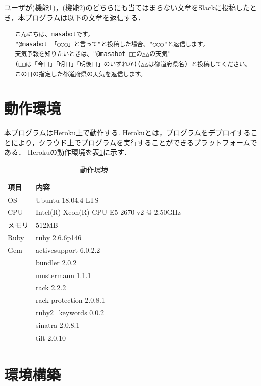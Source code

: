 \documentclass[12pt]{jsarticle}
\begin{document}
ユーザが(機能1)，(機能2)のどちらにも当てはまらない文章をSlackに投稿したとき，本プログラムは以下の文章を返信する．
\begin{verbatim}
   こんにちは、masabotです。        
   "@masabot 「○○○」と言って"と投稿した場合、"○○○"と返信します。
   天気予報を知りたいときは、"@masabot □□の△△の天気" 
   (□□は「今日」「明日」「明後日」のいずれか)(△△は都道府県名) と投稿してください。
   この日の指定した都道府県の天気を返信します。
\end{verbatim}

\section{動作環境}\label{sec:environment}
本プログラムはHeroku上で動作する.
Herokuとは，プログラムをデプロイすることにより，クラウド上でプログラムを実行することができるプラットフォームである．
Herokuの動作環境を表\ref{tab:2}に示す．
\begin{table}[t]
  \begin{center}
    \caption{動作環境}\label{tab:2}
    \begin{tabular}{l|l}
      \hline\hline
      \multicolumn{1}{l|}{項目} & \multicolumn{1}{l}{内容}\\
      \hline
      OS & Ubuntu 18.04.4 LTS\\
      CPU & Intel(R) Xeon(R) CPU E5-2670 v2 @ 2.50GHz\\
      メモリ & 512MB\\
      Ruby & ruby 2.6.6p146\\
      Gem & activesupport 6.0.2.2\\
     & bundler 2.0.2\\
     & mustermann 1.1.1\\
     & rack 2.2.2\\
     & rack-protection 2.0.8.1\\
     & ruby2\_keywords 0.0.2\\ 
     & sinatra 2.0.8.1\\
     & tilt 2.0.10\\
      \hline
    \end{tabular}
  \end{center}
\end{table}

\section{環境構築}
\end{document}

